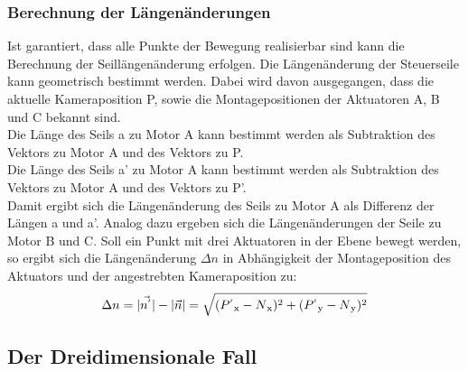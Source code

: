\documentclass[a4paper, 12pt]{article}
\begin{document}
			\subsubsection{Berechnung der Längenänderungen}
			Ist garantiert, dass alle Punkte der Bewegung realisierbar sind kann die Berechnung der Seillängenänderung erfolgen. 
			Die Längenänderung der Steuerseile kann geometrisch bestimmt werden.
			Dabei wird davon ausgegangen, dass die aktuelle Kameraposition P, sowie die Montagepositionen der Aktuatoren A, B und C bekannt sind.\\
			Die Länge des Seils a zu Motor A kann bestimmt werden als Subtraktion des Vektors zu Motor A und des Vektors zu P.\\
			Die Länge des Seils a' zu Motor A kann bestimmt werden als Subtraktion des Vektors zu Motor A und des Vektors zu P'.\\
			Damit ergibt sich die Längenänderung des Seils zu Motor A als Differenz der Längen a und a'.
			Analog dazu ergeben sich die Längenänderungen der Seile zu Motor B und C.
			Soll ein Punkt mit drei Aktuatoren in der Ebene bewegt werden,
			so ergibt sich die Längenänderung $\Delta n$ in Abhängigkeit der Montageposition des Aktuators und der angestrebten Kameraposition zu:
			\begin{align}
				\Delta n =
				|\vec{n^{'}}|-|\vec{n}|=
				\sqrt{
				(P^{'}\textsubscript{x}-N\textsubscript{x})^2+
				(P^{'}\textsubscript{y}-N\textsubscript{y})^2
				}
			\end{align}
		\subsection{Der Dreidimensionale Fall}	
\end{document}

